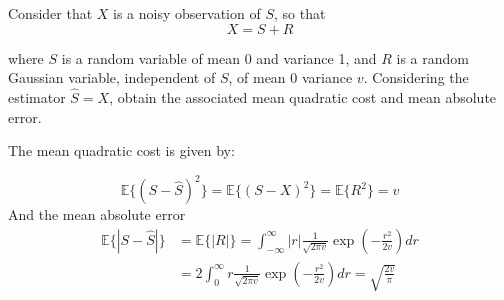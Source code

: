 \begin{example}
Consider that $X$ is a noisy observation of $S$, so that
\begin{equation}
X = S + R
\end{equation}

where $S$ is a random variable of mean 0 and variance 1, and $R$ is a random Gaussian variable, independent of $S$, of mean $0$ variance $v$. Considering the estimator $\hat{S} = X$, obtain the associated  mean quadratic cost and mean absolute error.

The mean quadratic cost is given by:

\begin{equation}
\mathbb{E}\{(S-\hat{S})^2\} = \mathbb{E}\{(S-X)^2\} = \mathbb{E}\{R^2\} = v
\end{equation}
And the mean absolute error
\begin{align}
\mathbb{E}\{|S-\hat{S}|\}
    &= \mathbb{E}\{|R|\} 
     = \int_{-\infty}^{\infty} |r| \frac{1}{\sqrt{2\pi v}}\exp\left(-\frac{r^2}{2v}\right)dr 
\nonumber\\
    &= 2 \int_{0}^{\infty} r \frac{1}{\sqrt{2\pi v}}\exp\left(-\frac{r^2}{2v}\right)dr 
     = \sqrt{\frac{2v}{\pi}}
\end{align}
\end{example}\vspace{0.4cm}